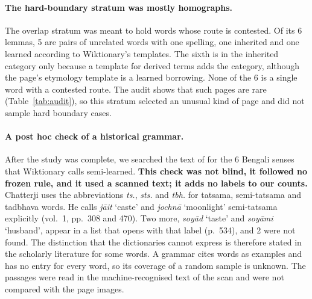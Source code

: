\documentclass[11pt]{article}
\newcommand{\gl}[1]{`#1'}
\begin{document}
\paragraph{The hard-boundary stratum was mostly homographs.} The overlap stratum was meant to hold words whose route is contested. Of its 6 lemmas, 5 are pairs of unrelated words with one spelling, one inherited and one learned according to Wiktionary's templates. The sixth is in the inherited category only because a template for derived terms adds the category, although the page's etymology template is a learned borrowing. None of the 6 is a single word with a contested route. The audit shows that such pages are rare (Table~\ref{tab:audit}), so this stratum selected an unusual kind of page and did not sample hard boundary cases.

\paragraph{A post hoc check of a historical grammar.} After the study was complete, we searched the text of \citet{chatterji1926} for the 6 Bengali senses that Wiktionary calls semi-learned. \textbf{This check was not blind, it followed no frozen rule, and it used a scanned text; it adds no labels to our counts.} Chatterji uses the abbreviations \textit{ts.}, \textit{sts.} and \textit{tbh.} for tatsama, semi-tatsama and tadbhava words. He calls \textit{j\=ait} \gl{caste} and \textit{jochn\=a} \gl{moonlight} semi-tatsama explicitly (vol.~1, pp.~308 and 470). Two more, \textit{soy\=ad} \gl{taste} and \textit{soy\=ami} \gl{husband}, appear in a list that opens with that label (p.~534), and 2 were not found. The distinction that the dictionaries cannot express is therefore stated in the scholarly literature for some words. A grammar cites words as examples and has no entry for every word, so its coverage of a random sample is unknown. The passages were read in the machine-recognised text of the scan and were not compared with the page images.
\end{document}
